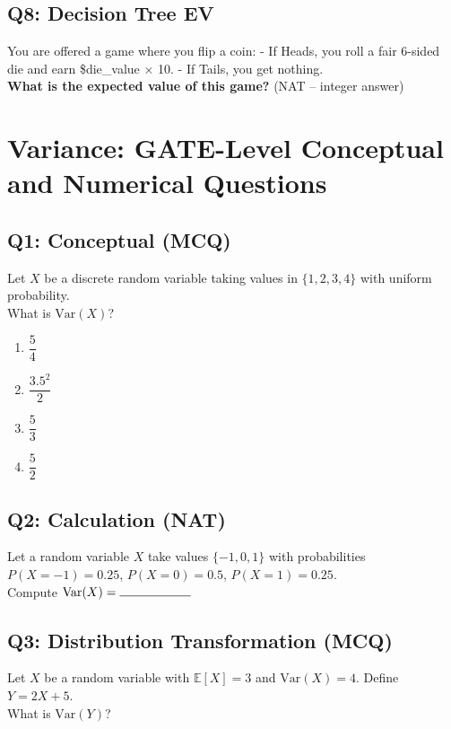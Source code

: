 \subsection*{Q8: Decision Tree EV}
You are offered a game where you flip a coin:
- If Heads, you roll a fair 6-sided die and earn \$die\_value × 10.
- If Tails, you get nothing.\\
\textbf{What is the expected value of this game?} (NAT – integer answer)


\section{Variance: GATE-Level Conceptual and Numerical Questions}

\subsection*{Q1: Conceptual (MCQ)}
Let $X$ be a discrete random variable taking values in $\{1,2,3,4\}$ with uniform probability.\\
What is $\text{Var}(X)$?

\begin{enumerate}[label=(\alph*)]
\item $\dfrac{5}{4}$
\item $\dfrac{3.5^2}{2}$
\item $\dfrac{5}{3}$
\item $\dfrac{5}{2}$
\end{enumerate}

\subsection*{Q2: Calculation (NAT)}
Let a random variable $X$ take values $\{-1, 0, 1\}$ with probabilities $P(X = -1) = 0.25$, $P(X = 0) = 0.5$, $P(X = 1) = 0.25$.\\
Compute $\text{Var}(X) = \rule{2cm}{0.15mm}$

\subsection*{Q3: Distribution Transformation (MCQ)}
Let $X$ be a random variable with $\mathbb{E}[X] = 3$ and $\text{Var}(X) = 4$. Define $Y = 2X + 5$.\\
What is $\text{Var}(Y)$?


